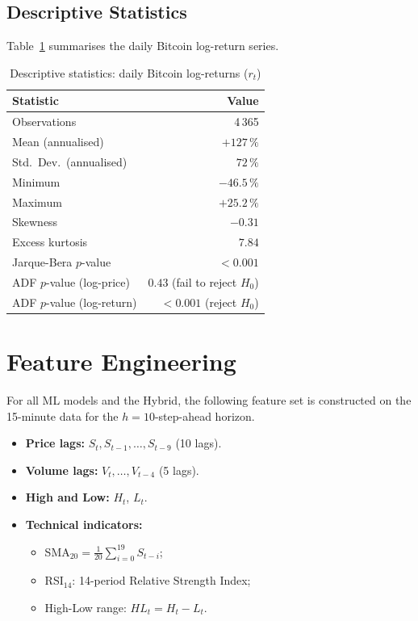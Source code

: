 \documentclass[12pt, a4paper, oneside]{report}
\theoremstyle{plain}
\theoremstyle{definition}
\theoremstyle{remark}
\begin{document}
\subsection{Descriptive Statistics}

Table~\ref{tab:desc_stats} summarises the daily Bitcoin log-return series.

\begin{table}[H]
\begin{singlespace}
\fontsize{10}{11}\selectfont
\caption{Descriptive statistics: daily Bitcoin log-returns ($r_t$)}
\label{tab:desc_stats}
\begin{tabular}{@{}lr@{}}
\toprule
Statistic & Value \\
\midrule
Observations         & 4\,365 \\
Mean (annualised)    & $+127\,\%$ \\
Std.\ Dev.\ (annualised) & $72\,\%$ \\
Minimum              & $-46.5\,\%$ \\
Maximum              & $+25.2\,\%$ \\
Skewness             & $-0.31$ \\
Excess kurtosis      & $7.84$ \\
Jarque-Bera $p$-value & $< 0.001$ \\
ADF $p$-value (log-price)  & $0.43$ (fail to reject $H_0$) \\
ADF $p$-value (log-return) & $< 0.001$ (reject $H_0$) \\
\bottomrule
\end{tabular}
\end{singlespace}
\end{table}

\section{Feature Engineering}

For all ML models and the Hybrid, the following feature set is constructed on
the 15-minute data for the $h = 10$-step-ahead horizon.

\begin{itemize}[leftmargin=1.25cm]
  \item \textbf{Price lags:} $S_t, S_{t-1}, \ldots, S_{t-9}$ (10 lags).
  \item \textbf{Volume lags:} $V_t, \ldots, V_{t-4}$ (5 lags).
  \item \textbf{High and Low:} $H_t$, $L_t$.
  \item \textbf{Technical indicators:}
    \begin{itemize}[leftmargin=1.25cm]
      \item SMA$_{20} = \frac{1}{20}\sum_{i=0}^{19}S_{t-i}$;
      \item RSI$_{14}$: 14-period Relative Strength Index;
      \item High-Low range: $HL_t = H_t - L_t$.
    \end{itemize}
\end{itemize}
\end{document}
